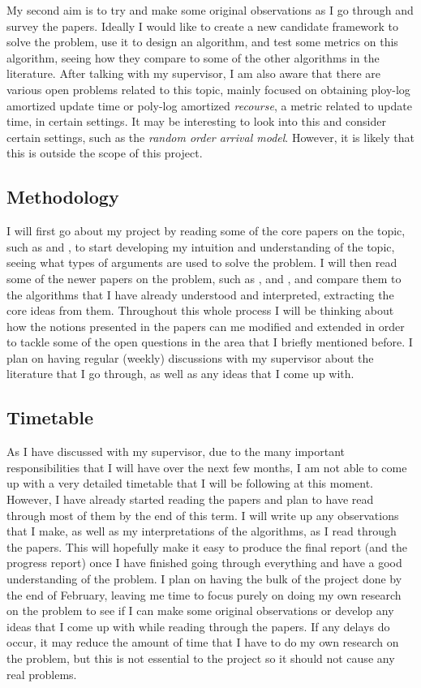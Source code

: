 \documentclass{article}
\begin{document}
My second aim is to try and make some original observations as I go through and survey the papers. Ideally I would like to create a new candidate framework to solve the problem, use it to design an algorithm, and test some metrics on this algorithm, seeing how they compare to some of the other algorithms in the literature. After talking with my supervisor, I am also aware that there are various open problems related to this topic, mainly focused on obtaining ploy-log amortized update time or poly-log amortized \textit{recourse}, a metric related to update time, in certain settings. It may be interesting to look into this and consider certain settings, such as the \textit{random order arrival model}. However, it is likely that this is outside the scope of this project.

\subsection{Methodology}

I will first go about my project by reading some of the core papers on the topic, such as \cite{HaeuplerKMST12} and \cite{BenderFG09}, to start developing my intuition and understanding of the topic, seeing what types of arguments are used to solve the problem. I will then read some of the newer papers on the problem, such as \cite{BenderFGT16}, \cite{BernsteinC18} and \cite{BhattacharyaK20}, and compare them to the algorithms that I have already understood and interpreted, extracting the core ideas from them. Throughout this whole process I will be thinking about how the notions presented in the papers can me modified and extended in order to tackle some of the open questions in the area that I briefly mentioned before. I plan on having regular (weekly) discussions with my supervisor about the literature that I go through, as well as any ideas that I come up with.

\subsection{Timetable}\label{timetable}

As I have discussed with my supervisor, due to the many important responsibilities that I will have over the next few months, I am not able to come up with a very detailed timetable that I will be following at this moment. However, I have already started reading the papers and plan to have read through most of them by the end of this term. I will write up any observations that I make, as well as my interpretations of the algorithms, as I read through the papers. This will hopefully make it easy to produce the final report (and the progress report) once I have finished going through everything and have a good understanding of the problem. I plan on having the bulk of the project done by the end of February, leaving me time to focus purely on doing my own research on the problem to see if I can make some original observations or develop any ideas that I come up with while reading through the papers. If any delays do occur, it may reduce the amount of time that I have to do my own research on the problem, but this is not essential to the project so it should not cause any real problems.
\end{document}

